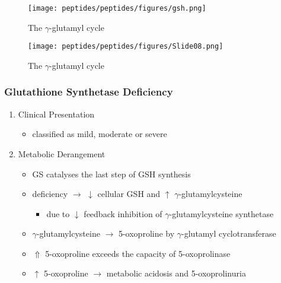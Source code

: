 \documentclass{scrartcl}
\begin{document}
\begin{figure}[htbp]
\centering
\texttt{[image: peptides/peptides/figures/gsh.png]}
\caption{\label{fig:orga18d458}The \(\gamma\)-glutamyl cycle}
\end{figure}


\begin{figure}[htbp]
\centering
\texttt{[image: peptides/peptides/figures/Slide08.png]}
\caption{\label{fig:org8175fa3}The \(\gamma\)-glutamyl cycle}
\end{figure}


\subsubsection{Glutathione Synthetase Deficiency}
\label{sec:orge37dba5}
\begin{enumerate}
\item Clinical Presentation
\label{sec:org2331e8c}
\begin{itemize}
\item classified as mild, moderate or severe
\end{itemize}

\item Metabolic Derangement
\label{sec:orgd069da0}
\begin{itemize}
\item GS catalyses the last step of GSH synthesis
\item deficiency \(\to\) \(\downarrow\) cellular GSH and \(\uparrow\) \(\gamma\)-glutamylcysteine
\begin{itemize}
\item due to \(\downarrow\) feedback inhibition of \(\gamma\)-glutamylcysteine synthetase
\end{itemize}
\item \(\gamma\)-glutamylcysteine \(\to\) 5-oxoproline by \(\gamma\)-glutamyl
cyclotransferase
\item \(\Uparrow\) 5-oxoproline exceeds the capacity of 5-oxoprolinase
\item \(\uparrow\) 5-oxoproline \(\to\) metabolic acidosis and 5-oxoprolinuria
\end{itemize}


\end{enumerate}
\end{document}

